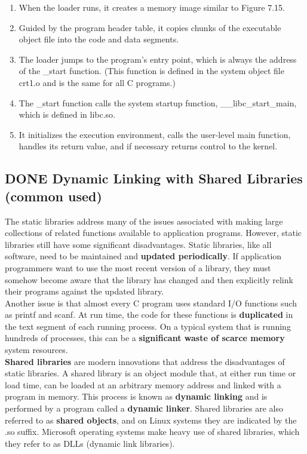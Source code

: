 \documentclass[11pt]{article}
\begin{document}
\begin{enumerate}
\item When the loader runs, it creates a memory image similar to Figure 7.15.\\
\item Guided by the program header table, it copies chunks of the executable object file into the code and data segments.\\
\item The loader jumps to the program’s entry point, which is always the address of the \_start function. (This function is defined in the system object file crt1.o and is the same for all C programs.)\\
\item The \_start function calls the system startup function, \_\_libc\_start\_main, which is defined in libc.so.\\
\item It initializes the execution environment, calls the user-level main function, handles its return value, and if necessary returns control to the kernel.\\
\end{enumerate}


\subsection{{\bfseries\sffamily DONE} Dynamic Linking with Shared Libraries (common used)}
\label{sec:orgda6f6b5}
The static libraries address many of the issues associated with making large collections of related functions available to application programs. However, static libraries still have some significant disadvantages. Static libraries, like all software, need to be maintained and \textbf{updated periodically}. If application programmers want to use the most recent version of a library, they must somehow become aware that the library has changed and then explicitly relink their programs against the updated library.\\


Another issue is that almost every C program uses standard I/O functions such as printf and scanf. At run time, the code for these functions is \textbf{duplicated} in the text segment of each running process. On a typical system that is running hundreds of processes, this can be a \textbf{significant waste of scarce memory} system resources.\\


\textbf{Shared libraries} are modern innovations that address the disadvantages of static libraries. A shared library is an object module that, at either run time or load time, can be loaded at an arbitrary memory address and linked with a program in memory. This process is known as \textbf{dynamic linking} and is performed by a program called a \textbf{dynamic linker}. Shared libraries are also referred to as \textbf{shared objects}, and on Linux systems they are indicated by the .so suffix. Microsoft operating systems make heavy use of shared libraries, which they refer to as DLLs (dynamic link libraries).\\
\end{document}
